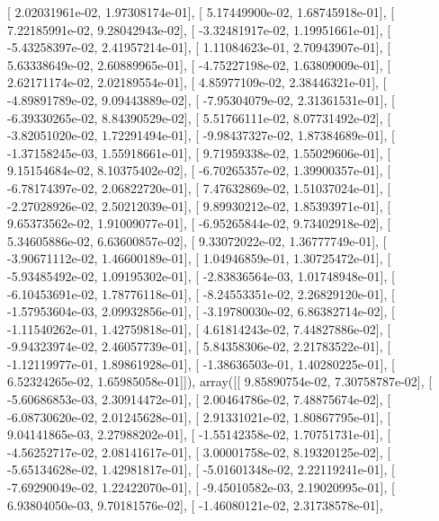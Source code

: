 \documentclass{article}
\begin{document}
       [  2.02031961e-02,   1.97308174e-01],
       [  5.17449900e-02,   1.68745918e-01],
       [  7.22185991e-02,   9.28042943e-02],
       [ -3.32481917e-02,   1.19951661e-01],
       [ -5.43258397e-02,   2.41957214e-01],
       [  1.11084623e-01,   2.70943907e-01],
       [  5.63338649e-02,   2.60889965e-01],
       [ -4.75227198e-02,   1.63809009e-01],
       [  2.62171174e-02,   2.02189554e-01],
       [  4.85977109e-02,   2.38446321e-01],
       [ -4.89891789e-02,   9.09443889e-02],
       [ -7.95304079e-02,   2.31361531e-01],
       [ -6.39330265e-02,   8.84390529e-02],
       [  5.51766111e-02,   8.07731492e-02],
       [ -3.82051020e-02,   1.72291494e-01],
       [ -9.98437327e-02,   1.87384689e-01],
       [ -1.37158245e-03,   1.55918661e-01],
       [  9.71959338e-02,   1.55029606e-01],
       [  9.15154684e-02,   8.10375402e-02],
       [ -6.70265357e-02,   1.39900357e-01],
       [ -6.78174397e-02,   2.06822720e-01],
       [  7.47632869e-02,   1.51037024e-01],
       [ -2.27028926e-02,   2.50212039e-01],
       [  9.89930212e-02,   1.85393971e-01],
       [  9.65373562e-02,   1.91009077e-01],
       [ -6.95265844e-02,   9.73402918e-02],
       [  5.34605886e-02,   6.63600857e-02],
       [  9.33072022e-02,   1.36777749e-01],
       [ -3.90671112e-02,   1.46600189e-01],
       [  1.04946859e-01,   1.30725472e-01],
       [ -5.93485492e-02,   1.09195302e-01],
       [ -2.83836564e-03,   1.01748948e-01],
       [ -6.10453691e-02,   1.78776118e-01],
       [ -8.24553351e-02,   2.26829120e-01],
       [ -1.57953604e-03,   2.09932856e-01],
       [ -3.19780030e-02,   6.86382714e-02],
       [ -1.11540262e-01,   1.42759818e-01],
       [  4.61814243e-02,   7.44827886e-02],
       [ -9.94323974e-02,   2.46057739e-01],
       [  5.84358306e-02,   2.21783522e-01],
       [ -1.12119977e-01,   1.89861928e-01],
       [ -1.38636503e-01,   1.40280225e-01],
       [  6.52324265e-02,   1.65985058e-01]]), array([[  9.85890754e-02,   7.30758787e-02],
       [ -5.60686853e-03,   2.30914472e-01],
       [  2.00464786e-02,   7.48875674e-02],
       [ -6.08730620e-02,   2.01245628e-01],
       [  2.91331021e-02,   1.80867795e-01],
       [  9.04141865e-03,   2.27988202e-01],
       [ -1.55142358e-02,   1.70751731e-01],
       [ -4.56252717e-02,   2.08141617e-01],
       [  3.00001758e-02,   8.19320125e-02],
       [ -5.65134628e-02,   1.42981817e-01],
       [ -5.01601348e-02,   2.22119241e-01],
       [ -7.69290049e-02,   1.22422070e-01],
       [ -9.45010582e-03,   2.19020995e-01],
       [  6.93804050e-03,   9.70181576e-02],
       [ -1.46080121e-02,   2.31738578e-01],
\end{document}
